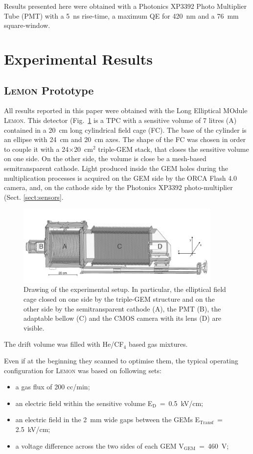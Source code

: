 \documentclass[physics,article,submit,moreauthors,pdftex]{Definitions/mdpi}
\newcommand{\lemon}{{\textsc{Lemon}}\xspace}
\newcommand{\Ed}  {E$_{\mathrm{D}}$\xspace}
\newcommand{\Et}  {E$_{\mathrm{Transf}}$\xspace}
\newcommand{\Vg}  {V$_{\mathrm{GEM}}$\xspace}
\begin{document}
Results presented here were obtained with a
Photonics XP3392 Photo Multiplier Tube (PMT) with a 5~ns rise-time, a maximum QE for 420~nm and a 76~mm square-window.


\section{Experimental Results}
\subsection{\lemon Prototype}
All results reported in this paper were obtained with the Long Elliptical MOdule \lemon. This detector (Fig.~\ref{fig:lemon} is a TPC with a sensitive volume of 7 litres (A) contained in a 20~cm long cylindrical field cage (FC). The base of the cylinder is an ellipse with 24~cm and 20~cm axes. The shape of the FC was chosen in order to couple it with a 24$\times$20~cm$^2$ triple-GEM stack, that closes the sensitive volume on  one side. On the other side, the volume is close be a mesh-based semitransparent cathode. Light produced inside the GEM holes during the multiplication processes is acquired on the GEM side by the ORCA Flash 4.0 camera, and, on the cathode side by the Photonics XP3392 photo-multiplier (Sect. \ref{sect:sensors}.

\begin{figure}[ht]
\centering
\includegraphics[width=0.9\textwidth]{lemon.png}
\caption{Drawing of the experimental setup. In particular, the elliptical field cage closed on one side by the triple-GEM structure and on the other side by the semitransparent cathode (A), the PMT (B), the adaptable bellow (C) and the CMOS camera with its lens (D) are visible.} \label{fig:lemon}
\end{figure}

The drift volume was filled with He/CF$_4$ based gas mixtures. 


Even if at the beginning they scanned to optimise them, the typical operating configuration for \lemon was based on following sets: 
\begin{itemize}
    \item a gas flux of 200 cc/min;
    \item an electric field within the sensitive volume \Ed~=~0.5~kV/cm;
    \item an electric field in the 2~mm wide gaps between the GEMs \Et~= 2.5~kV/cm;
    \item a voltage difference across the two sides of each GEM \Vg~=~460~V;
\end{itemize}
\end{document}
